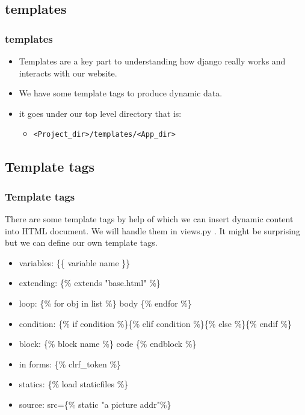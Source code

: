 \documentclass{beamer}
\begin{document}
\subsection{templates}
\begin{frame}[fragile]
\frametitle{templates}
\begin{itemize}
	\item Templates are a key part to understanding how django really works and interacts with our website.
	\item We have some template tags to produce dynamic data.
	\item it goes under our top level directory that is:
	\begin{itemize}
		\item 
		\lstset{language=Bash}
		\begin{lstlisting}[frame=single]
<Project_dir>/templates/<App_dir>\end{lstlisting}
		
	\end{itemize}
\end{itemize}
\end{frame}

\subsection{Template tags}
\begin{frame}
	\frametitle{Template tags}
	There are some template tags by help of which we can insert dynamic content into HTML document. We will handle them in views.py . It might be surprising but we can define our own template tags.
	\begin{itemize}
		\item variables: \{\{ variable name \}\}
		\item extending: \{\% extends "base.html" \%\}
		\item loop: \{\% for obj in list \%\} body \{\% endfor \%\}
		\item condition: \{\% if condition \%\}\{\% elif condition \%\}\{\% else \%\}\{\% endif \%\}
		\item block: \{\% block name \%\} code \{\% endblock \%\}
		\item in forms: \{\% clrf\_token \%\}
		\item statics: \{\% load staticfiles \%\}
		\item source: src=\{\% static "a picture addr"\%\}
	\end{itemize}
\end{frame}
\end{document}
